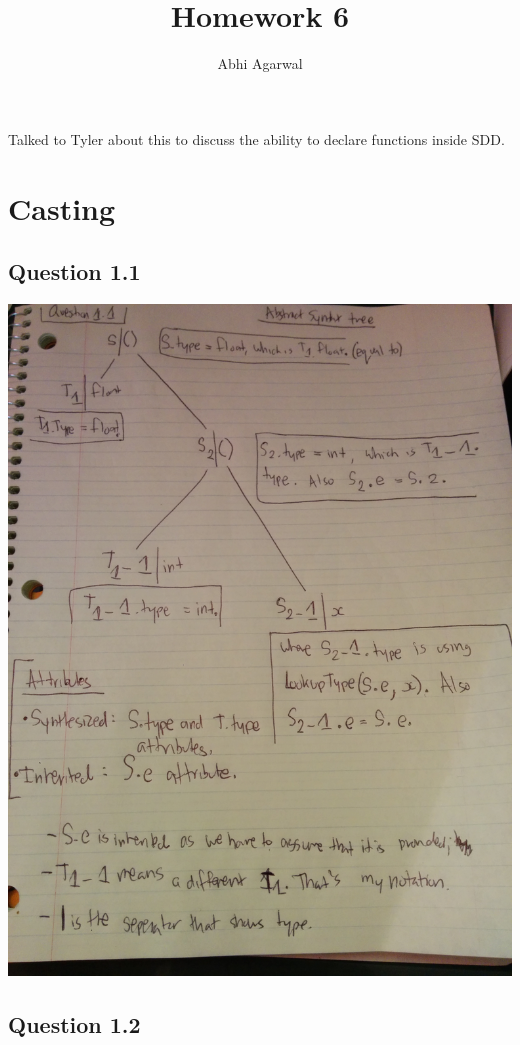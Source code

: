 \documentclass[11pt, oneside]{article}   	%
\title{Homework 6}
\author{Abhi Agarwal}
\date{}
\begin{document}
\maketitle

\par Talked to Tyler about this to discuss the ability to declare functions inside SDD.

\section{Casting}
\subsection*{Question 1.1}
\includegraphics[scale=0.19]{IMG_20141011_142752.jpg}

\newpage

\subsection*{Question 1.2}
\end{document}
